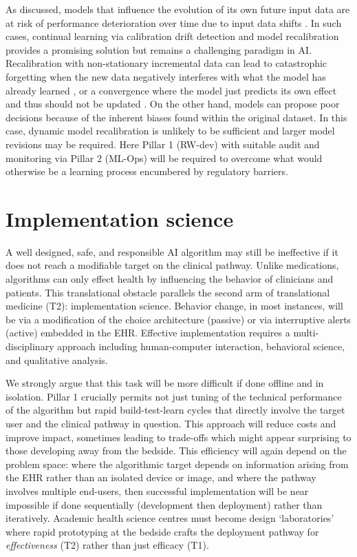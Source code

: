 As discussed, models that influence the evolution of its own future
input data are at risk of performance deterioration over time due to
input data shifts \citep{davis2017}. In such cases, continual learning
via calibration drift detection and model recalibration
\citep{feng2022, davis2020} provides a promising solution but remains a
challenging paradigm in AI. Recalibration with non-stationary
incremental data can lead to catastrophic forgetting when the new data
negatively interferes with what the model has already learned
\citep{parisi2019}, or a convergence where the model just predicts its
own effect and thus should not be updated \citep{liley2021}. On the
other hand, models can propose poor decisions because of the inherent
biases found within the original dataset. In this case, dynamic model
recalibration is unlikely to be sufficient and larger model revisions
may be required. Here Pillar 1 (RW-dev) with suitable audit and
monitoring via Pillar 2 (ML-Ops) will be required to overcome what would
otherwise be a learning process encumbered by regulatory
barriers.\citep{lee2020}

\hypertarget{implementation-science}{%
\section{Implementation science}\label{implementation-science}}

A well designed, safe, and responsible AI algorithm may still be
ineffective if it does not reach a modifiable target on the clinical
pathway.\citep{the2021} Unlike medications, algorithms can only effect
health by influencing the behavior of clinicians and patients. This
translational obstacle parallels the second arm of translational
medicine (T2): implementation science.\citep{woolf2008b} Behavior
change, in most instances, will be via a modification of the choice
architecture (passive)\citep{halpern2018, main2010} or via interruptive
alerts (active) embedded in the EHR.\citep{main2010} Effective
implementation requires a multi-disciplinary approach including
human-computer interaction, behavioral science, and qualitative
analysis.\citep{sendak2020}

We strongly argue that this task will be more difficult if done offline
and in isolation. Pillar 1 crucially permits not just tuning of the
technical performance of the algorithm but rapid build-test-learn cycles
that directly involve the target user and the clinical pathway in
question. This approach will reduce costs and improve impact, sometimes
leading to trade-offs which might appear surprising to those developing
away from the bedside.\citep{shah2019, morse2020a} This efficiency will
again depend on the problem space: where the algorithmic target depends
on information arising from the EHR rather than an isolated device or
image, and where the pathway involves multiple end-users, then
successful implementation will be near impossible if done sequentially
(development then deployment) rather than
iteratively.\citep{sendak2020, connell2019} Academic health science
centres must become design `laboratories' where rapid prototyping at the
bedside crafts the deployment pathway for \emph{effectiveness} (T2)
rather than just efficacy (T1).\citep{woolf2008b}

